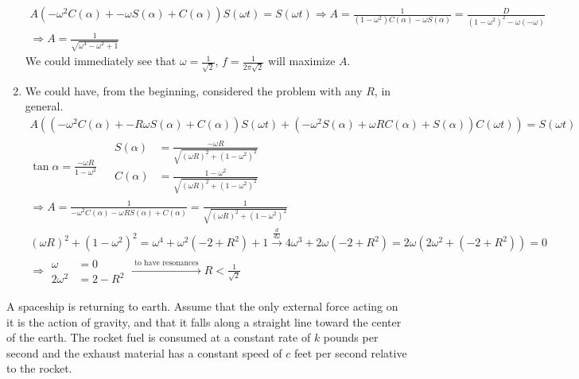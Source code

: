 \documentclass[twoside]{amsart}
\theoremstyle{plain}
\theoremstyle{definition}
\newcommand{\exercisehead}[1]
  {\smallskip
   \noindent{\small\bf Exercise #1.}}
\begin{document}
\begin{enumerate}
\[
\begin{gathered}
A (-\omega^2 C(\alpha) + - \omega S(\alpha) + C(\alpha) )S(\omega t) = S(\omega t) \Longrightarrow A = \frac{1}{ (1-\omega^2 )C(\alpha) - \omega S(\alpha) } = \frac{D}{ (1 - \omega^2)^2 - \omega(-\omega) } \\
\Longrightarrow \boxed{ A = \frac{1}{ \sqrt{ \omega^4 - \omega^2 + 1 } } }
\end{gathered}
\]
We could immediately see that $\omega = \frac{1}{ \sqrt{2}}$, $f= \frac{1}{ 2 \pi \sqrt{2}}$ will maximize $A$.  
\item We could have, from the beginning, considered the problem with any $R$, in general.
\[
\begin{gathered}
  A ((-\omega^2 C(\alpha) + - R \omega S(\alpha) + C(\alpha) )S(\omega t) + (-\omega^2 S(\alpha) + \omega R C(\alpha) + S(\alpha) ) C(\omega t) ) = S(\omega t ) \\
  \tan{\alpha} = \frac{ - \omega R }{ 1 - \omega^2 } \quad \, \begin{aligned}
    S(\alpha) & = \frac{ - \omega R }{ \sqrt{ (\omega R)^2 + ( 1 - \omega^2 )^2 } } \\
    C(\alpha) & = \frac{ 1 - \omega^2 }{ \sqrt{ ( \omega R)^2 + (1-\omega^2)^2 } }
\end{aligned} \\
  \Longrightarrow A = \frac{1}{ -\omega^2 C(\alpha)  - \omega R S(\alpha) + C(\alpha) } = \frac{1}{ \sqrt{ (\omega R)^2 + ( 1 - \omega^2)^2 } } \\
(\omega R)^2 + ( 1- \omega^2)^2 = \omega^4 + \omega^2 ( -2 + R^2 ) + 1 \xrightarrow{ \frac{d}{d\omega } } 4\omega^3 + 2 \omega ( -2 +R^2) = 2\omega ( 2\omega^2 + (-2 + R^2) ) = 0 \\
  \Longrightarrow \begin{aligned}
    \omega & = 0 \\
    2 \omega^2 & = 2 - R^2 
\end{aligned} \xrightarrow{ \text{ to have resonances } } \boxed{ R < \frac{1}{ \sqrt{2}} }
\end{gathered}
\]
\end{enumerate}

\exercisehead{10} A spaceship is returning to earth.  Assume that the only external force acting on it is the action of gravity, and that it falls along a straight line toward the center of the earth.  The rocket fuel is consumed at a constant rate of $k$ pounds per second and the exhaust material has a constant speed of $c$ feet per second relative to the rocket.  
\end{document}
